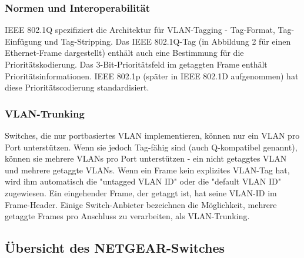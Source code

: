         \subsubsection{Normen und Interoperabilität}
        IEEE 802.1Q spezifiziert die Architektur für VLAN-Tagging - Tag-Format, Tag-Einfügung und Tag-Stripping. Das IEEE 802.1Q-Tag (in Abbildung 2 für einen Ethernet-Frame dargestellt) enthält auch eine Bestimmung für die Prioritätskodierung. Das 3-Bit-Prioritätsfeld im getaggten Frame enthält Prioritätsinformationen. IEEE 802.1p (später in IEEE 802.1D aufgenommen) hat diese Prioritätscodierung standardisiert.

        \subsubsection{VLAN-Trunking}
        Switches, die nur portbasiertes VLAN implementieren, können nur ein VLAN pro Port unterstützen. Wenn sie jedoch Tag-fähig sind (auch Q-kompatibel genannt), können sie mehrere VLANs pro Port unterstützen - ein nicht getaggtes VLAN und mehrere getaggte VLANs. Wenn ein Frame kein explizites VLAN-Tag hat, wird ihm automatisch die "untagged VLAN ID" oder die "default VLAN ID" zugewiesen. Ein eingehender Frame, der getaggt ist, hat seine VLAN-ID im Frame-Header. Einige Switch-Anbieter bezeichnen die Möglichkeit, mehrere getaggte Frames pro Anschluss zu verarbeiten, als VLAN-Trunking.

    \newpage
    \subsection{Übersicht des NETGEAR-Switches}

